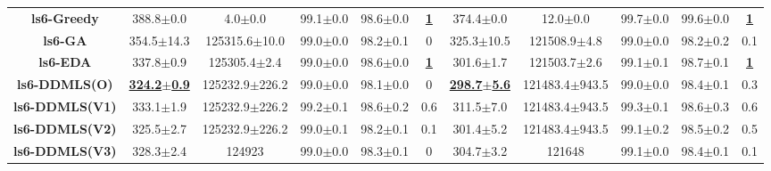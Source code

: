 \documentclass[lettersize,journal]{IEEEtran}
\begin{document}
\begin{table}[!t]
{\begin{tabular}{ccccccccccc}
        \midrule
        {\bfseries ls6-Greedy} &388.8$\pm$0.0 &4.0$\pm$0.0 & 99.1$\pm$0.0 &98.6$\pm$0.0 &\underline{\bfseries 1} &374.4$\pm$0.0 &12.0$\pm$0.0& 99.7$\pm$0.0 &99.6$\pm$0.0 &\underline{\bfseries 1} \\
        {\bfseries ls6-GA} &354.5$\pm$14.3 &125315.6$\pm$10.0 & 99.0$\pm$0.0 &98.2$\pm$0.1 &0 &325.3$\pm$10.5 &121508.9$\pm$4.8& 99.0$\pm$0.0 &98.2$\pm$0.2 &0.1 \\
        {\bfseries ls6-EDA} &337.8$\pm$0.9 &125305.4$\pm$2.4 & 99.0$\pm$0.0 &98.6$\pm$0.0 &\underline{\bfseries 1} &301.6$\pm$1.7 &121503.7$\pm$2.6& 99.1$\pm$0.1 &98.7$\pm$0.1 &\underline{\bfseries 1} \\
        {\bfseries ls6-DDMLS(O)} &\underline{\bfseries324.2$\pm$0.9} &125232.9$\pm$226.2 & 99.0$\pm$0.0 &98.1$\pm$0.0 &0 &\underline{\bfseries298.7$\pm$5.6} &121483.4$\pm$943.5& 99.0$\pm$0.0 &98.4$\pm$0.1 &0.3 \\
        {\bfseries ls6-DDMLS(V1)} &333.1$\pm$1.9 &125232.9$\pm$226.2 & 99.2$\pm$0.1 &98.6$\pm$0.2 &0.6 &311.5$\pm$7.0 &121483.4$\pm$943.5& 99.3$\pm$0.1 &98.6$\pm$0.3 &0.6 \\
        {\bfseries ls6-DDMLS(V2)} &325.5$\pm$2.7 &125232.9$\pm$226.2 & 99.0$\pm$0.1 &98.2$\pm$0.1 &0.1 &301.4$\pm$5.2 &121483.4$\pm$943.5& 99.1$\pm$0.2 &98.5$\pm$0.2 &0.5 \\
        {\bfseries ls6-DDMLS(V3)} &328.3$\pm$2.4 &124923 & 99.0$\pm$0.0 &98.3$\pm$0.1 &0 &304.7$\pm$3.2 &121648& 99.1$\pm$0.0 &98.4$\pm$0.1 &0.1 \\
        
        \bottomrule
        \end{tabular}
    }
    \label{fullresult:APP}
\end{table}

\ifCLASSOPTIONcaptionsoff
  \newpage
\fi





\end{document}
